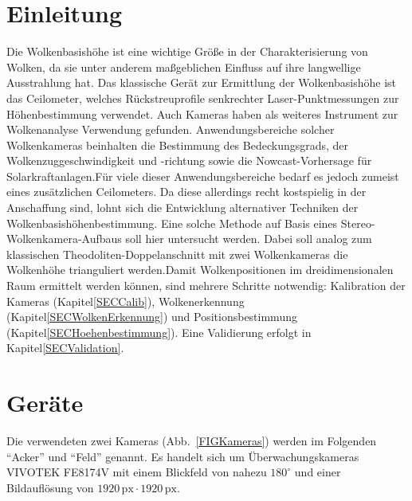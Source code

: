 \documentclass[a4paper,11pt,twoside,german]{article}
\newcommand{\absatz}{\smallbreak}
\begin{document}
\listoffigures %

\newpage


\section{Einleitung}
Die Wolkenbasishöhe ist eine wichtige Größe in der Charakterisierung von Wolken,
da sie unter anderem maßgeblichen Einfluss auf ihre langwellige Ausstrahlung
hat.  Das klassische Gerät zur Ermittlung der Wolkenbasishöhe ist das
Ceilometer, welches Rückstreuprofile senkrechter Laser-Punktmessungen zur
Höhenbestimmung verwendet.  Auch Kameras haben als weiteres Instrument zur
Wolkenanalyse Verwendung gefunden. Anwendungsbereiche solcher Wolkenkameras
beinhalten die Bestimmung des Bedeckungsgrads, der Wolkenzuggeschwindigkeit und
-richtung sowie die Nowcast-Vorhersage für Solarkraftanlagen.\absatz Für viele
dieser Anwendungsbereiche bedarf es jedoch zumeist eines zusätzlichen
Ceilometers. Da diese allerdings recht kostspielig in der Anschaffung sind,
lohnt sich die Entwicklung alternativer Techniken der
Wolkenbasishöhenbestimmung. Eine solche Methode auf Basis eines
Stereo-Wolkenkamera-Aufbaus soll hier untersucht werden.  Dabei soll analog zum
klassischen Theodoliten-Doppelanschnitt mit zwei Wolkenkameras die Wolkenhöhe
trianguliert werden.\absatz Damit Wolkenpositionen im dreidimensionalen Raum
ermittelt werden können, sind mehrere Schritte notwendig: Kalibration der
Kameras (Kapitel\;\ref{SECCalib}), Wolkenerkennung
(Kapitel\;\ref{SECWolkenErkennung}) und Positionsbestimmung
(Kapitel\;\ref{SECHoehenbestimmung}). Eine Validierung erfolgt in
Kapitel\;\ref{SECValidation}.


\section{Geräte}
\label{SECGeraete}

Die verwendeten zwei Kameras (Abb.~\ref{FIGKameras}) werden im Folgenden
\enquote{Acker} und \enquote{Feld} genannt. Es handelt sich um
Überwachungskameras VIVOTEK FE8174V mit einem Blickfeld von nahezu $180^\circ$
und einer Bildauflösung von $1920\,\mathrm{px} \cdot 1920
\,\mathrm{px}$.
\absatz
\end{document}
